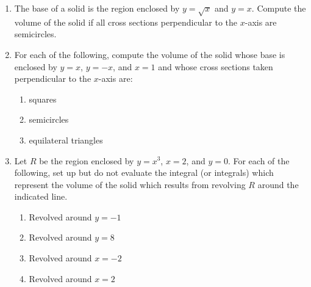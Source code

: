 \documentclass[12pt]{article}
\newif\ifans
\begin{document}
\begin{enumerate}
\ifans{\fbox{144}} \fi

\item The base of a solid is the region enclosed by $y=\sqrt{x}$ and $y=x$.  Compute the volume of the solid if all cross sections perpendicular to the $x$-axis are semicircles.

\ifans{\fbox{$\frac{\pi}{240}$}} \fi

\item For each of the following, compute the volume of the solid whose base is enclosed by $y=x$, $y=-x$, and $x=1$  and whose cross sections taken perpendicular to the $x$-axis are:

\begin{enumerate}

\item squares

\ifans{\fbox{$\frac{4}{3}$}} \fi

\item semicircles

\ifans{\fbox{$\frac{\pi}{6}$}} \fi

\item equilateral triangles

\ifans{\fbox{$\frac{\sqrt{3}}{3}$}} \fi

\end{enumerate}

\item Let $R$ be the region enclosed by $y=x^3$, $x=2$, and $y=0$.  For each of the following, set up but do not evaluate the integral (or integrals) which represent the volume of the solid which results from revolving $R$ around the indicated line.

\begin{enumerate}

\item Revolved around $y=-1$

\ifans{\fbox{$\pi \int_0^2 \left((x^3+1)^2-1\right) \,dx$}} \fi

\item Revolved around $y=8$

\ifans{\fbox{$\pi \int_0^2 \left(64-(8-x^3)^2\right) \,dx$}} \fi

\item Revolved around $x=-2$

\ifans{\fbox{$\pi \int_0^8 \left(16-(\sqrt[3]{y}+2)^2\right)\,dy$}} \fi

\item Revolved around $x=2$

\ifans{\fbox{$\pi \int_0^8 (2-\sqrt[3]{y})^2 \,dy$}} \fi


\end{enumerate}
\end{enumerate}
\end{document}
